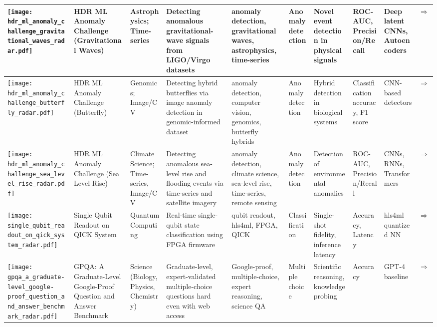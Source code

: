 \begin{landscape}
{\begin{longtable}{|p{}|p{}|p{}|p{}|p{}|p{}|p{}|p{}|p{}|p{}|}
\texttt{[image: hdr\_ml\_anomaly\_challenge\_gravitational\_waves\_radar.pdf]} & HDR ML Anomaly Challenge (Gravitational Waves) & Astrophysics; Time-series & Detecting anomalous gravitational-wave signals from LIGO/Virgo datasets & anomaly detection, gravitational waves, astrophysics, time-series & Anomaly detection & Novel event detection in physical signals & ROC-AUC, Precision/Recall & Deep latent CNNs, Autoencoders & \cite{campolongo2025buildingmachinelearningchallenges}\href{https://www.codabench.org/competitions/2626/}{$\Rightarrow$} \\ \hline
\texttt{[image: hdr\_ml\_anomaly\_challenge\_butterfly\_radar.pdf]} & HDR ML Anomaly Challenge (Butterfly) & Genomics; Image/CV & Detecting hybrid butterflies via image anomaly detection in genomic-informed dataset & anomaly detection, computer vision, genomics, butterfly hybrids & Anomaly detection & Hybrid detection in biological systems & Classification accuracy, F1 score & CNN-based detectors & \cite{campolongo2025buildingmachinelearningchallenges}\href{https://www.codabench.org/competitions/3764/}{$\Rightarrow$} \\ \hline
\texttt{[image: hdr\_ml\_anomaly\_challenge\_sea\_level\_rise\_radar.pdf]} & HDR ML Anomaly Challenge (Sea Level Rise) & Climate Science; Time-series, Image/CV & Detecting anomalous sea-level rise and flooding events via time-series and satellite imagery & anomaly detection, climate science, sea-level rise, time-series, remote sensing & Anomaly detection & Detection of environmental anomalies & ROC-AUC, Precision/Recall & CNNs, RNNs, Transformers & \cite{campolongo2025buildingmachinelearningchallenges}\href{https://www.codabench.org/competitions/3223/}{$\Rightarrow$} \\ \hline
\texttt{[image: single\_qubit\_readout\_on\_qick\_system\_radar.pdf]} & Single Qubit Readout on QICK System & Quantum Computing & Real-time single-qubit state classification using FPGA firmware & qubit readout, hls4ml, FPGA, QICK & Classification & Single-shot fidelity, inference latency & Accuracy, Latency & hls4ml quantized NN & \cite{diguglielmo2025endtoendworkflowmachinelearningbased}\href{https://github.com/fastmachinelearning/ml-quantum-readout}{$\Rightarrow$} \\ \hline
\texttt{[image: gpqa\_a\_graduate-level\_google-proof\_question\_and\_answer\_benchmark\_radar.pdf]} & GPQA: A Graduate-Level Google-Proof Question and Answer Benchmark & Science (Biology, Physics, Chemistry) & Graduate-level, expert-validated multiple-choice questions hard even with web access & Google-proof, multiple-choice, expert reasoning, science QA & Multiple choice & Scientific reasoning, knowledge probing & Accuracy & GPT-4 baseline & \cite{rein2023gpqagraduatelevelgoogleproofqa}\href{https://arxiv.org/abs/2311.12022}{$\Rightarrow$} \\ \hline

\end{longtable}}
\end{landscape}
